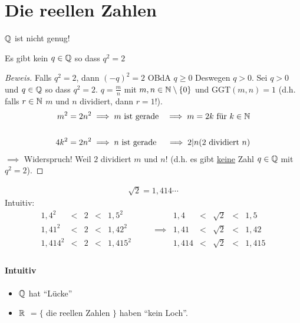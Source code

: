 \section{Die reellen Zahlen}
$\mathbb{Q}$ ist nicht genug!

\begin{Sat}
  Es gibt kein $q\in\mathbb{Q}$ so dass $q^2=2$
\end{Sat}
\begin{proof}[Beweis]
  Falls $q^2=2$, dann $(-q)^2=2$ OBdA $q\geq 0$ Deswegen $q>0$. Sei $q>0$ und $q\in\mathbb{Q}$ so dass $q^2=2$. 
$q=\frac{m}{n}$ mit $m,n\in\mathbb{N}\setminus \{0\}$ und $\text{GGT}(m,n)=1$ (d.h. falls $r\in\mathbb{N}$ $m$ und $n$ dividiert, dann $r=1$!).
  \begin{align*}
    m^2=2n^2&\implies m \text{ ist gerade}&\implies m=2k \text{ für } k\in\mathbb{N}\\\\
    4k^2=2n^2&\implies n \text{ ist gerade}&\implies 2| n \text{(2 dividiert $n$)}
  \end{align*}
  $\implies$ Widerspruch! Weil $2$ dividiert $m$ und $n$! (d.h. es gibt \underline{keine} Zahl $q\in\mathbb{Q}$ mit $q^2=2$).
\end{proof}
\begin{Bsp}
  \begin{align*}
    \sqrt{2}=1,414\cdots
  \end{align*}
  Intuitiv:
  \begin{align*}
    1,4^2 & < & 2 & < & 1,5^2 & & 1,4 & < & \sqrt{2} & < & 1,5 \\
    1,41^2 & < & 2 & < & 1,42^2 & \qquad\implies & 1,41 & < & \sqrt{2} & < & 1,42 \\
    1,414^2 & < & 2 & < & 1,415^2 & & 1,414 & < & \sqrt{2} & < & 1,415 \\
  \end{align*}
\end{Bsp}
\paragraph{Intuitiv}
\begin{itemize}
  \item $\mathbb{Q}$ hat ``Lücke''
  \item $\mathbb{R}$ $= \{$ die reellen Zahlen $\}$ haben ``kein Loch''.
\end{itemize}
